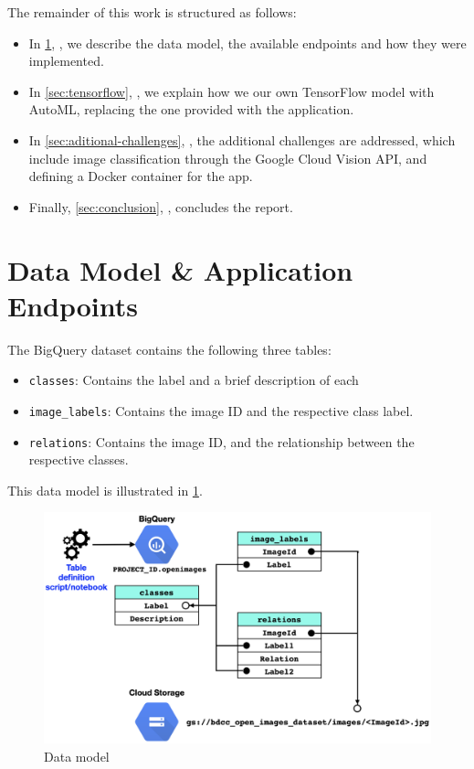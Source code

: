 \documentclass[a4paper, 11pt]{article}
\begin{document}
The remainder of this work is structured as follows:

\begin{itemize}
    \item In \cref{sec:data-model}, \textbf{}, we describe the data model,
    the available endpoints and how they were implemented.
    \item In \cref{sec:tensorflow}, \textbf{}, we explain how we our own 
    TensorFlow model with AutoML, replacing the one provided with the application.
    \item In \cref{sec:aditional-challenges}, \textbf{}, the 
    additional challenges are addressed, which include image classification through the Google Cloud 
    Vision API, and defining a Docker container for the app.
    \item Finally, \cref{sec:conclusion}, \textbf{}, concludes the report.
\end{itemize}

\pagebreak

\section{Data Model \& Application Endpoints} \label{sec:data-model}

The BigQuery dataset contains the following three tables:

\begin{itemize}
    \item \texttt{classes}: Contains the label and a brief description of each 
    \item \texttt{image\_labels}: Contains the image ID and the respective class label.
    \item \texttt{relations}: Contains the image ID, and the relationship between the respective 
    classes.
\end{itemize}

This data model is illustrated in \cref{fig:data-model}.

\vspace{\baselineskip}

\begin{figure}[H]
    \centering
    \includegraphics[width=.75\textwidth]{img/data-model.png}
    \caption{Data model}
    \label{fig:data-model}
\end{figure}
\end{document}

